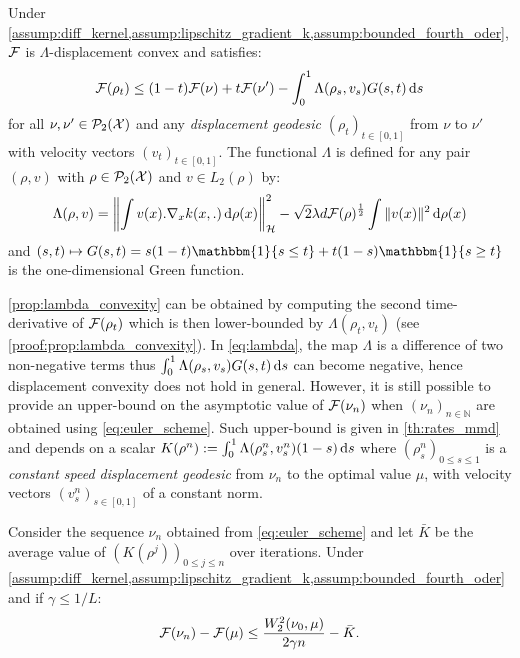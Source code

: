 \begin{proposition}
	\label{prop:lambda_convexity} Under \cref{assump:diff_kernel,assump:lipschitz_gradient_k,assump:bounded_fourth_oder}, ${{\mathcal F}}$ is $\Lambda$-displacement convex and satisfies:
		\begin{equation}
	{{\mathcal F}}(\rho_{t})\leq(1-t){{\mathcal F}}(\nu)+t{{\mathcal F}}(\nu')-\int_0^1 \Lambda(\rho_s, v_s ) G(s,t)\mathop{}\!\mathrm{d} s
	\end{equation}
for all $\nu, \nu'\in \mathcal{P}_2({{\mathcal X}})$ and any \textit{displacement geodesic} $(\rho_t)_{t\in[0,1]}$ from $\nu$ to $\nu'$ with velocity vectors $(v_t)_{t \in[0,1]}$. The functional $\Lambda$ is defined for any pair $(\rho,v)$ with $\rho\in \mathcal{P}_2({{\mathcal X}})$ and $v\in L_2(\rho)$  by:
	\begin{align}\label{eq:lambda}
		\Lambda(\rho,v) = \left\Vert \int v(x).\nabla_x k(x,.) \mathop{}\!\mathrm{d} \rho(x) \right\Vert^2_{\mathcal{H}} - \sqrt{2}\lambda d {{\mathcal F}}(\rho)^{\frac{1}{2}}  \int \Vert  v(x) \Vert^2 \mathop{}\!\mathrm{d} \rho(x) 
	\end{align}
and $(s,t)\mapsto G(s,t)=  s(1-t) \mathbbm{1}\{s\leq t\}+ t(1-s) \mathbbm{1}\{s\geq t\}$	is the one-dimensional Green function.
	\end{proposition}
\cref{prop:lambda_convexity} can be obtained by computing the second time-derivative of ${{\mathcal F}}(\rho_t)$ which is then lower-bounded by $\Lambda(\rho_t,v_t)$ (see \cref{proof:prop:lambda_convexity}).
In \cref{eq:lambda}, the map $\Lambda$ is a difference of two non-negative terms thus $\int_0^1 \Lambda(\rho_s, v_s ) G(s,t)\mathop{}\!\mathrm{d} s$ can become negative, hence displacement convexity does not hold in general. However, it is still possible to provide an upper-bound on the asymptotic value of ${{\mathcal F}}(\nu_n)$ when $(\nu_n)_{n \in \mathbb{N}}$ are obtained using \cref{eq:euler_scheme}. Such upper-bound is given in \cref{th:rates_mmd} and depends on a scalar $ K(\rho^n) :=  \int_0^1\Lambda(\rho_s^n,v_s^n)(1-s)\mathop{}\!\mathrm{d} s$ where $(\rho_s^n)_{0\leq s\leq 1}$ is a \textit{constant speed displacement geodesic} from $\nu_n$ to the optimal value $\mu$, with velocity vectors $(v_s^n)_{s \in [0,1]}$ of a constant norm.  
\begin{theorem}\label{th:rates_mmd}
	Consider the sequence $\nu_n$ obtained from \cref{eq:euler_scheme} and let $\bar{K}$ be the average value of $(K(\rho^j))_{0\leq j \leq n}$ over iterations.  Under \cref{assump:diff_kernel,assump:lipschitz_gradient_k,assump:bounded_fourth_oder} and if $\gamma \leq 1/L$:%
\begin{align}
{{\mathcal F}}(\nu_n) - {{\mathcal F}}(\mu)\leq  \frac{W_2^2(\nu_0,\mu)}{2 \gamma n} -\bar{K}.
\end{align}
\end{theorem}
